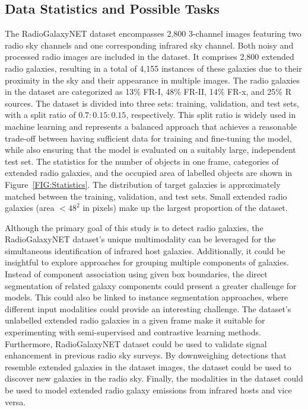 \documentclass[
  journal=pasa,
  manuscript=research-paper, %
  year=2020,
  volume=37,
]{cup-journal}
\begin{document}
\subsection{Data Statistics and Possible Tasks}
\label{SEC:Datastats}
The RadioGalaxyNET dataset encompasses 2,800 3-channel images featuring two radio sky channels and one corresponding infrared sky channel. 
Both noisy and processed radio images are included in the dataset. 
It comprises 2,800 extended radio galaxies, resulting in a total of 4,155 instances of these galaxies due to their proximity in the sky and their appearance in multiple images. 
The radio galaxies in the dataset are categorized as 13\% FR-I, 48\% FR-II, 14\% FR-x, and 25\% R sources.
The dataset is divided into three sets: training, validation, and test sets, with a split ratio of $0.7:0.15:0.15$, respectively. 
This split ratio is widely used in machine learning and represents a balanced approach that achieves a reasonable trade-off between having sufficient data for training and fine-tuning the model, while also ensuring that the model is evaluated on a suitably large, independent test set.
The statistics for the number of objects in one frame, categories of extended radio galaxies, and the occupied area of labelled objects are shown in Figure~\ref{FIG:Statistics}. 
The distribution of target galaxies is approximately matched between the training, validation, and test sets. 
Small extended radio galaxies (area $< 48^2$ in pixels) make up the largest proportion of the dataset.

Although the primary goal of this study is to detect radio galaxies, the RadioGalaxyNET dataset's unique multimodality can be leveraged for the simultaneous identification of infrared host galaxies. 
Additionally, it could be insightful to explore approaches for grouping multiple components of galaxies. 
Instead of component association using given box boundaries, the direct segmentation of related galaxy components could present a greater challenge for models. 
This could also be linked to instance segmentation approaches, where different input modalities could provide an interesting challenge.
The dataset's unlabelled extended radio galaxies in a given frame make it suitable for experimenting with semi-supervised and contrastive learning methods.
Furthermore, RadioGalaxyNET dataset could be used to validate signal enhancement in previous radio sky surveys. 
By downweighing detections that resemble extended galaxies in the dataset images, the dataset could be used to discover new galaxies in the radio sky. 
Finally, the modalities in the dataset could be used to model extended radio galaxy emissions from infrared hosts and vice versa.
\end{document}
